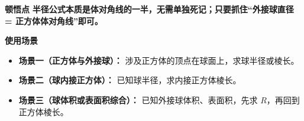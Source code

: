 \begin{explanationbox}
	\medskip
	\textbf{\textcolor{CExplanation}{顿悟点}}
	\textbf{半径公式本质是体对角线的一半，无需单独死记；只要抓住“外接球直径 = 正方体体对角线”即可。}

	\medskip
	\textbf{\textcolor{CExplanation}{使用场景}}

	\begin{itemize}[leftmargin=*, itemsep=0.5em, topsep=0.4em]
		\item \textbf{场景一（正方体与外接球）：} 涉及正方体的顶点在球面上，求球半径或棱长。
		\item \textbf{场景二（球内接正方体）：} 已知球半径，求内接正方体棱长。
		\item \textbf{场景三（球体积或表面积综合）：} 已知外接球体积、表面积，先求 $R$，再回到正方体棱长。
	\end{itemize}
\end{explanationbox}